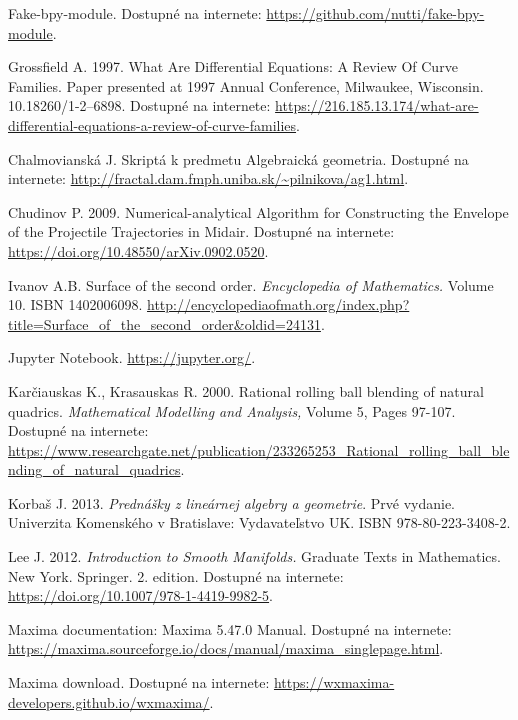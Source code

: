 \documentclass[12pt, twoside]{book}
\theoremstyle{definition}
\begin{document}
\begin{thebibliography}{99}
 Fake-bpy-module. Dostupné na internete: \url{https://github.com/nutti/fake-bpy-module}.

 Grossfield A. 1997. What Are Differential Equations: A Review Of Curve Families. Paper presented at 1997 Annual Conference, Milwaukee, Wisconsin. 10.18260/1-2--6898. Dostupné na internete: \url{https://216.185.13.174/what-are-differential-equations-a-review-of-curve-families}.


 Chalmovianská J. Skriptá k predmetu Algebraická geometria. Dostupné na internete: \url{http://fractal.dam.fmph.uniba.sk/~pilnikova/ag1.html}.

 Chudinov P. 2009. Numerical-analytical Algorithm for Constructing the Envelope of the Projectile Trajectories in Midair. Dostupné na internete: \url{https://doi.org/10.48550/arXiv.0902.0520}.

 Ivanov A.B. Surface of the second order. \textit{Encyclopedia of Mathematics.} Volume 10. ISBN 1402006098. \url{http://encyclopediaofmath.org/index.php?title=Surface_of_the_second_order&oldid=24131}.

 Jupyter Notebook. \url{https://jupyter.org/}.

 Karčiauskas K., Krasauskas R. 2000. Rational rolling ball blending of natural quadrics. \textit{Mathematical Modelling and Analysis,} Volume 5, Pages 97-107. Dostupné na internete: \url{https://www.researchgate.net/publication/233265253_Rational_rolling_ball_blending_of_natural_quadrics}.

 Korbaš J. 2013. \textit{Prednášky z lineárnej algebry a geometrie}. Prvé vydanie. Univerzita Komenského v Bratislave: Vydavateľstvo UK.  ISBN 978-80-223-3408-2.

 Lee J. 2012. \textit{Introduction to Smooth Manifolds.} Graduate Texts in Mathematics. New York. Springer. 2. edition. Dostupné na internete: \url{https://doi.org/10.1007/978-1-4419-9982-5}.

 Maxima documentation: Maxima 5.47.0 Manual. Dostupné na internete: \url{https://maxima.sourceforge.io/docs/manual/maxima_singlepage.html}.

 Maxima download. Dostupné na internete: \url{https://wxmaxima-developers.github.io/wxmaxima/}.


\end{thebibliography}
\end{document}
